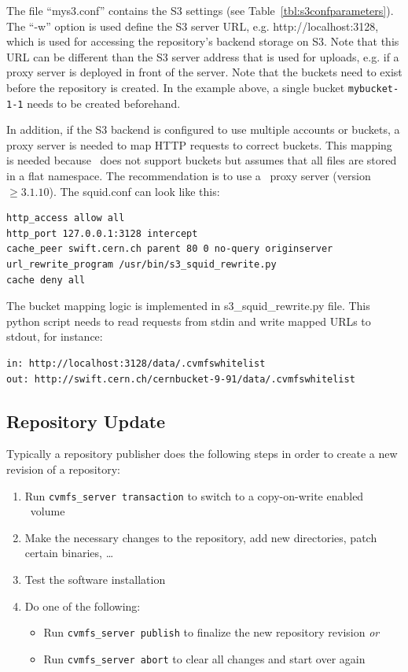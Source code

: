 The file ``mys3.conf'' contains the S3 settings (see Table~\ref{tbl:s3confparameters}).
The ``-w'' option is used define the S3 server URL, e.g. http://localhost:3128, which is used for accessing the repository's backend storage on S3.
Note that this URL can be different than the S3 server address that is used for uploads, e.g. if a proxy server is deployed in front of the server.
Note that the buckets need to exist before the repository is created.
In the example above, a single bucket \texttt{mybucket-1-1} needs to be created beforehand.


In addition, if the S3 backend is configured to use multiple accounts or buckets, a proxy server is needed to map HTTP requests to correct buckets.
This mapping is needed because \cvmfs\ does not support buckets but assumes that all files are stored in a flat namespace.
The recommendation is to use a \squid\ proxy server (version $\geq 3.1.10$).
The squid.conf can look like this:
\begin{verbatim}
http_access allow all
http_port 127.0.0.1:3128 intercept
cache_peer swift.cern.ch parent 80 0 no-query originserver
url_rewrite_program /usr/bin/s3_squid_rewrite.py
cache deny all
\end{verbatim}

The bucket mapping logic is implemented in s3\_squid\_rewrite.py file.
This python script needs to read requests from stdin and write mapped URLs to stdout, for instance:
\begin{verbatim}
in: http://localhost:3128/data/.cvmfswhitelist
out: http://swift.cern.ch/cernbucket-9-91/data/.cvmfswhitelist
\end{verbatim}

\subsection{Repository Update}
\label{sct:repoupdateprocedure}
Typically a repository publisher does the following steps in order to create a new revision of a repository:
\begin{enumerate}
	\item Run \texttt{cvmfs\_server transaction} to switch to a copy-on-write enabled \cvmfs\ volume
	\item Make the necessary changes to the repository, \eg add new directories, patch certain binaries, \dots
	\item Test the software installation
	\item Do one of the following:
	\begin{itemize}
		\item Run \texttt{cvmfs\_server publish} to finalize the new repository revision \emph{or}
		\item Run \texttt{cvmfs\_server abort} to clear all changes and start over again
	\end{itemize}
\end{enumerate}

